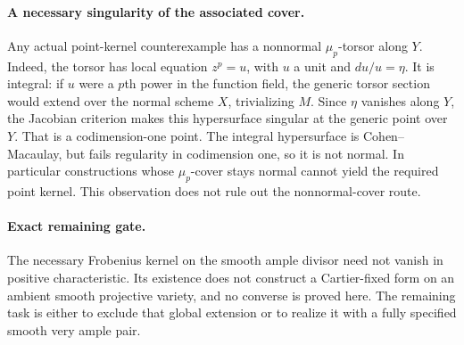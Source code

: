 \paragraph{A necessary singularity of the associated cover.}
Any actual point-kernel counterexample has a nonnormal
$\mu_p$-torsor along $Y$. Indeed, the torsor has local equation
$z^p=u$, with $u$ a unit and $du/u=\eta$. It is integral:
if $u$ were a $p$th power in the function field, the generic
torsor section would extend over the normal scheme $X$,
trivializing $M$. Since $\eta$ vanishes along $Y$, the
Jacobian criterion makes this hypersurface singular at the
generic point over $Y$. That is a codimension-one point.
The integral hypersurface is Cohen--Macaulay, but fails
regularity in codimension one, so it is not normal. In
particular constructions whose $\mu_p$-cover stays normal
cannot yield the required point kernel. This observation
does not rule out the nonnormal-cover route.

\paragraph{Exact remaining gate.}
The necessary Frobenius kernel on the smooth ample divisor
need not vanish in positive characteristic. Its existence
does not construct a Cartier-fixed form on an ambient smooth
projective variety, and no converse is proved here. The
remaining task is either to exclude that global extension or
to realize it with a fully specified smooth very ample pair.
